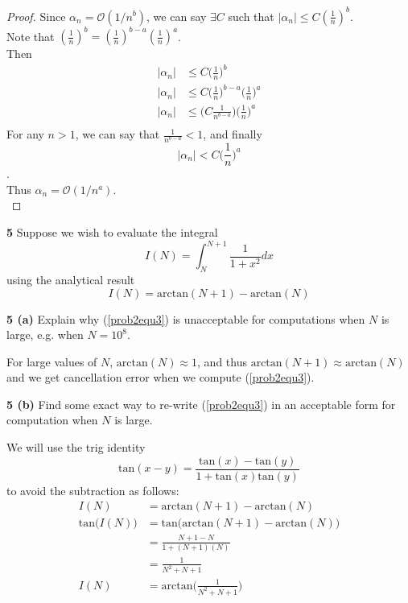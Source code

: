 \documentclass[12pt]{article}
\begin{document}
	\begin{proof}
		Since $\alpha_n = \mathcal{O}(1/n^b)$, we can say $\exists C$ such that $\vert \alpha_n \vert \leq C(\frac{1}{n})^b$. \\
		Note that $(\frac{1}{n})^{b} = (\frac{1}{n})^{b-a} (\frac{1}{n})^{a}$. \\
		Then \\
		\begin{align*}
			\vert \alpha_n \vert & \leq C\Big(\frac{1}{n}\Big)^b \\
			\vert \alpha_n \vert & \leq C\Big(\frac{1}{n}\Big)^{b-a} \Big(\frac{1}{n}\Big)^{a} \\
			\vert \alpha_n \vert & \leq \Big(C\frac{1}{n^{b-a}}\Big) \Big(\frac{1}{n}\Big)^{a} \\
		\end{align*}
		For any $n>1$, we can say that $\frac{1}{n^{b-a}} < 1$, and finally $$\vert \alpha_n \vert < C \Big(\frac{1}{n}\Big)^{a}$$. \\
		Thus $\alpha_n = \mathcal{O}(1/n^a)$. \\
	\end{proof}
	
\hspace{-7 ex}\textbf{5}    Suppose we wish to evaluate the integral \\
	\begin{equation*}
			I(N) = \int_{N}^{N+1}\frac{1}{1+x^2}dx
	\end{equation*}
	using the analytical result \\
	\begin{equation}\label{prob2equ3}
		I(N) = \text{arctan}(N+1) - \text{arctan}(N)
	\end{equation}
	
\hspace{-7 ex}\textbf{5 (a)} Explain why (\ref{prob2equ3}) is unacceptable for computations when $N$ is large, e.g. when $N = 10^8$. \bigbreak

	For large values of $N$, $\text{arctan}(N) \approx 1$, and thus $\text{arctan}(N+1) \approx \text{arctan}(N)$ and we get cancellation error when we compute (\ref{prob2equ3}). \bigbreak
	
\hspace{-7 ex}\textbf{5 (b)} Find some exact way to re-write (\ref{prob2equ3}) in an acceptable form for computation when $N$ is large. \bigbreak
	
	We will use the trig identity $$ \text{tan}(x-y) = \frac{\text{tan}(x) - \text{tan}(y)}{1 + \text{tan}(x)\text{tan}(y)}$$ to avoid the subtraction as follows: \\
	\begin{align}
		I(N) & = \text{arctan}(N+1) - \text{arctan}(N) \nonumber \\
		\text{tan}\big(I(N)\big) & = \text{tan}\big(\text{arctan}(N+1) - \text{arctan}(N) \big) \nonumber \\
		& = \frac{N + 1 - N}{1 + (N+1)(N)} \nonumber \\
		& = \frac{1}{N^2 + N + 1} \nonumber \\
		I(N) & = \text{arctan}\bigg(\frac{1}{N^2 + N + 1}\bigg) \label{prob5b}
	\end{align}
	
\end{document}
